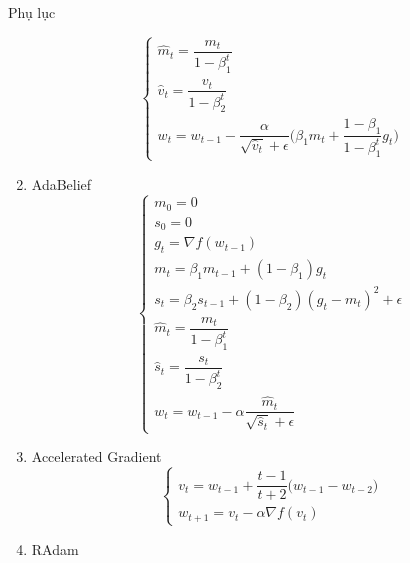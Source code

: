 \documentclass[10pt]{beamer}
\theoremstyle{remark}
\theoremstyle{definition}
\begin{document}
\begin{frame}[allowframebreaks]{Phụ lục}
\begin{enumerate}
\begin{equation*}
\begin{cases}
				\hat{m}_t = \dfrac{m_t}{1 - \beta_1^t} \\ \hat{v}_t = \dfrac{v_t}{1 - \beta_2^t} \\ w_t = w_{t-1} -  \dfrac{\alpha}{\sqrt{\hat{v}_t} + \epsilon}\Bigg(\beta_1\hat{m}_t + \dfrac{1-\beta_1}{1-\beta_1^t}g_t\Bigg) \end{cases}
		\end{equation*}
		\item AdaBelief
		\begin{equation*}
			\begin{cases}m_0 = 0\\ s_0 = 0\\ g_t = \nabla f(w_{t-1}) \\ m_t = \beta_1 m_{t-1} + (1-\beta_1) g_t \\ s_t = \beta_2 s_{t-1} + (1-\beta_2)(g_t - m_t)^2 + \epsilon\\
				\hat{m}_t = \dfrac{m_t}{1 - \beta_1^t} \\ \hat{s}_t = \dfrac{s_t}{1 - \beta_2^t} \\ w_t = w_{t-1} - \alpha \dfrac{\hat{m}_t}{\sqrt{\hat{s}_t} + \epsilon} \end{cases}
		\end{equation*}
		\item Accelerated Gradient
		\begin{equation*}
			\begin{cases}v_t = w_{t-1} + \dfrac{t - 1}{t + 2} \big(w_{t-1} - w_{t-2} \big) \\
			w_{t+1} = v_t - \alpha \nabla f(v_t) \end{cases}
		\end{equation*}
		\item RAdam
		\begingroup
\end{enumerate}
\end{frame}
\end{document}
